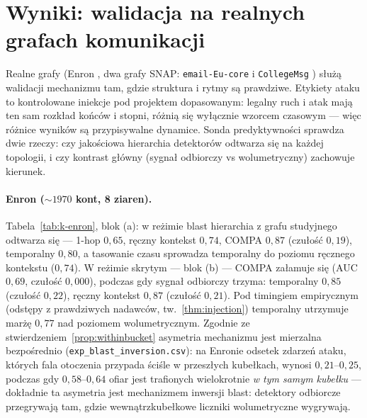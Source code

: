\section{Wyniki: walidacja na realnych grafach komunikacji}
\label{sec:k-realne}

Realne grafy (Enron \citep{klimt2004enron}, dwa grafy SNAP:
\texttt{email-Eu-core} \citep{paranjape2017motifs} i
\texttt{CollegeMsg} \citep{panzarasa2009patterns}) służą walidacji
mechanizmu tam, gdzie struktura i rytmy są prawdziwe. Etykiety ataku
to kontrolowane iniekcje pod projektem dopasowanym: legalny ruch
i atak mają ten sam rozkład końców i stopni, różnią się wyłącznie
wzorcem czasowym --- więc różnice wyników są przypisywalne dynamice.
Sonda predyktywności sprawdza dwie rzeczy: czy jakościowa
hierarchia detektorów odtwarza się na każdej topologii, i czy
kontrast główny (sygnał odbiorczy vs wolumetryczny) zachowuje
kierunek.

\paragraph{Enron ($\sim\!1970$ kont, 8 ziaren).}
Tabela~\ref{tab:k-enron}, blok (a): w reżimie blast hierarchia
z grafu studyjnego odtwarza się --- 1-hop $0{,}65$, ręczny kontekst
$0{,}74$, COMPA $0{,}87$ (czułość $0{,}19$), temporalny $0{,}80$,
a tasowanie czasu sprowadza temporalny do poziomu ręcznego
kontekstu ($0{,}74$). W reżimie skrytym --- blok (b) --- COMPA
załamuje się (AUC $0{,}69$, czułość $0{,}000$), podczas gdy
sygnał odbiorczy trzyma: temporalny $0{,}85$ (czułość $0{,}22$),
ręczny kontekst $0{,}87$ (czułość $0{,}21$). Pod timingiem
empirycznym (odstępy z prawdziwych nadawców, tw.~\ref{thm:injection})
temporalny utrzymuje marżę $0{,}77$ nad poziomem wolumetrycznym.
Zgodnie ze stwierdzeniem~\ref{prop:withinbucket} asymetria
mechanizmu jest mierzalna bezpośrednio (\texttt{exp\_blast\_inversion.csv}):
na Enronie odsetek zdarzeń ataku, których fala otoczenia przypada
ściśle w przeszłych kubełkach, wynosi $0{,}21$--$0{,}25$, podczas
gdy $0{,}58$--$0{,}64$ ofiar jest trafionych wielokrotnie \emph{w tym
samym kubełku} --- dokładnie ta asymetria jest mechanizmem inwersji
blast: detektory odbiorcze przegrywają tam, gdzie
wewnątrzkubełkowe liczniki wolumetryczne wygrywają.

